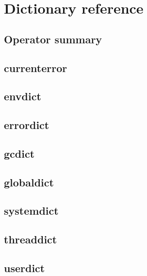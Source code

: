 \section{Dictionary reference}
\subsection{Operator summary}
\subsection{currenterror}
\subsection{envdict}
\subsection{errordict}
\subsection{gcdict}
\subsection{globaldict}
\subsection{systemdict}
\subsection{threaddict}
\subsection{userdict}
